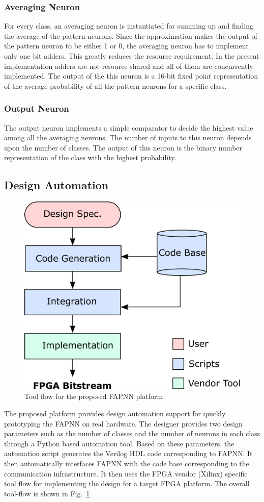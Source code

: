 \subsubsection{\bf Averaging Neuron}
For every class, an averaging neuron is instantiated for summing up and finding the average of the pattern neurons.
Since the approximation makes the output of the pattern neuron to be either 1 or 0, the averaging neuron has to implement only one bit adders.
This greatly reduces the resource requirement.
In the present implementation adders are not resource shared and all of them are concurrently implemented.
The output of the this neuron is a 16-bit fixed point representation of the average probability of all the pattern neurons for a specific class.

\subsubsection{\bf Output Neuron}
The output neuron implements a simple comparator to decide the highest value among all the averaging neurons.
The number of inputs to this neuron depends upon the number of classes.
The output of this neuron is the binary number representation of the class with the highest probability.

\subsection{Design Automation} 

\begin{figure}[t]
\centering
   \includegraphics[height=0.6\columnwidth]{Figures/toolFlow.pdf}
   \caption{Tool flow for the proposed FAPNN platform}
   \label{fig:toolFlow}
\end{figure}

The proposed platform provides design automation support for quickly prototyping the FAPNN on real hardware.
The designer provides two design parameters such as the number of classes and the number of neurons in each class through a Python based automation tool.
Based on these parameters, the automation script generates the Verilog HDL code corresponding to FAPNN.
It then automatically interfaces FAPNN with the code base corresponding to the communication infrastructure.
It then uses the FPGA vendor (Xilinx) specific tool flow for implementing the design for a target FPGA platform.
The overall tool-flow is shown in Fig.~\ref{fig:toolFlow}